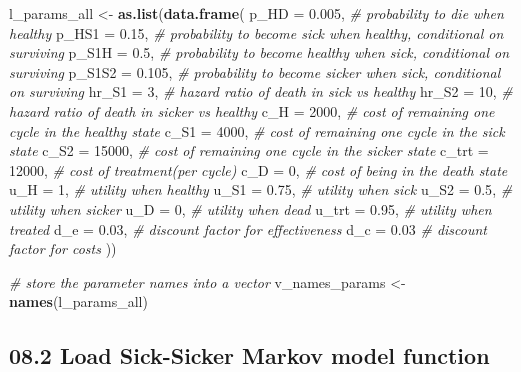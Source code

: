 \documentclass[
]{article}
\newenvironment{Shaded}{\begin{snugshade}}{\end{snugshade}}
\newcommand{\CommentTok}[1]{\textcolor[rgb]{0.56,0.35,0.01}{\textit{#1}}}
\newcommand{\DataTypeTok}[1]{\textcolor[rgb]{0.13,0.29,0.53}{#1}}
\newcommand{\DecValTok}[1]{\textcolor[rgb]{0.00,0.00,0.81}{#1}}
\newcommand{\FloatTok}[1]{\textcolor[rgb]{0.00,0.00,0.81}{#1}}
\newcommand{\KeywordTok}[1]{\textcolor[rgb]{0.13,0.29,0.53}{\textbf{#1}}}
\newcommand{\NormalTok}[1]{#1}
\newcommand{\StringTok}[1]{\textcolor[rgb]{0.31,0.60,0.02}{#1}}
\begin{document}
\begin{Shaded}
\begin{Highlighting}[]
\NormalTok{l_params_all <-}\StringTok{ }\KeywordTok{as.list}\NormalTok{(}\KeywordTok{data.frame}\NormalTok{(}
  \DataTypeTok{p_HD    =} \FloatTok{0.005}\NormalTok{,  }\CommentTok{# probability to die when healthy}
  \DataTypeTok{p_HS1   =} \FloatTok{0.15}\NormalTok{,   }\CommentTok{# probability to become sick when healthy, conditional on surviving}
  \DataTypeTok{p_S1H   =} \FloatTok{0.5}\NormalTok{,    }\CommentTok{# probability to become healthy when sick, conditional on surviving}
  \DataTypeTok{p_S1S2  =} \FloatTok{0.105}\NormalTok{,  }\CommentTok{# probability to become sicker when sick, conditional on surviving}
  \DataTypeTok{hr_S1   =} \DecValTok{3}\NormalTok{,      }\CommentTok{# hazard ratio of death in sick vs healthy}
  \DataTypeTok{hr_S2   =} \DecValTok{10}\NormalTok{,     }\CommentTok{# hazard ratio of death in sicker vs healthy}
  \DataTypeTok{c_H     =} \DecValTok{2000}\NormalTok{,   }\CommentTok{# cost of remaining one cycle in the healthy state}
  \DataTypeTok{c_S1    =} \DecValTok{4000}\NormalTok{,   }\CommentTok{# cost of remaining one cycle in the sick state}
  \DataTypeTok{c_S2    =} \DecValTok{15000}\NormalTok{,  }\CommentTok{# cost of remaining one cycle in the sicker state}
  \DataTypeTok{c_trt   =} \DecValTok{12000}\NormalTok{,  }\CommentTok{# cost of treatment(per cycle)}
  \DataTypeTok{c_D     =} \DecValTok{0}\NormalTok{,      }\CommentTok{# cost of being in the death state}
  \DataTypeTok{u_H     =} \DecValTok{1}\NormalTok{,      }\CommentTok{# utility when healthy}
  \DataTypeTok{u_S1    =} \FloatTok{0.75}\NormalTok{,   }\CommentTok{# utility when sick}
  \DataTypeTok{u_S2    =} \FloatTok{0.5}\NormalTok{,    }\CommentTok{# utility when sicker}
  \DataTypeTok{u_D     =} \DecValTok{0}\NormalTok{,      }\CommentTok{# utility when dead}
  \DataTypeTok{u_trt   =} \FloatTok{0.95}\NormalTok{,   }\CommentTok{# utility when treated}
  \DataTypeTok{d_e     =} \FloatTok{0.03}\NormalTok{,   }\CommentTok{# discount factor for effectiveness}
  \DataTypeTok{d_c     =} \FloatTok{0.03}    \CommentTok{# discount factor for costs}
\NormalTok{))}

\CommentTok{# store the parameter names into a vector}
\NormalTok{v_names_params <-}\StringTok{ }\KeywordTok{names}\NormalTok{(l_params_all)}
\end{Highlighting}
\end{Shaded}

\hypertarget{load-sick-sicker-markov-model-function}{%
\subsection{08.2 Load Sick-Sicker Markov model
function}\label{load-sick-sicker-markov-model-function}}
\end{document}
